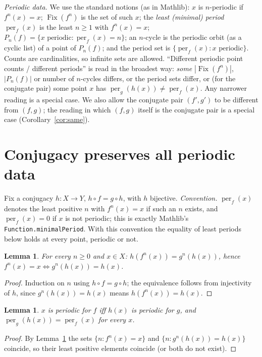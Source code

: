 \documentclass[11pt]{article}
\newtheorem{lemma}[theorem]{Lemma}
\theoremstyle{definition}
\theoremstyle{remark}
\renewcommand{\_}{\oldus\allowbreak}
\newcommand{\Fix}{\operatorname{Fix}}
\newcommand{\per}{\operatorname{per}}
\begin{document}
\emph{Periodic data.} We use the standard notions (as in Mathlib): $x$ is $n$-periodic if
$f^n(x)=x$; $\Fix(f^n)$ is the set of such $x$; the \emph{least (minimal) period} $\per_f(x)$ is the
least $n\ge1$ with $f^n(x)=x$; $P_n(f)=\{x \text{ periodic}: \per_f(x)=n\}$; an $n$-cycle is the periodic
orbit (as a cyclic list) of a point of $P_n(f)$; and the period set is $\{\per_f(x): x\text{ periodic}\}$.
Counts are cardinalities, so infinite sets are allowed. ``Different periodic point counts / different
periods'' is read in the broadest way: \emph{some} $|\Fix(f^n)|$, $|P_n(f)|$ or number of $n$-cycles
differs, or the period sets differ, or (for the conjugate pair) some point $x$ has
$\per_g(h(x))\neq\per_f(x)$. Any narrower reading is a special case. We also allow the conjugate pair
$(f',g')$ to be different from $(f,g)$; the reading in which $(f,g)$ itself is the conjugate pair is a
special case (Corollary~\ref{cor:same}).

\section{Conjugacy preserves all periodic data}

Fix a conjugacy $h\colon X\to Y$, $h\circ f=g\circ h$, with $h$ bijective.
\emph{Convention.} $\per_f(x)$ denotes the least positive $n$ with $f^n(x)=x$ if such an $n$ exists, and
$\per_f(x)=0$ if $x$ is not periodic; this is exactly Mathlib's \texttt{Function.minimalPeriod}. With
this convention the equality of least periods below holds at every point, periodic or not.

\begin{lemma}\label{lem:iter}
For every $n\ge0$ and $x\in X$: $h(f^n(x))=g^n(h(x))$, hence $f^n(x)=x \iff g^n(h(x))=h(x)$.
\end{lemma}
\begin{proof}
Induction on $n$ using $h\circ f=g\circ h$; the equivalence follows from injectivity of $h$, since
$g^n(h(x))=h(x)$ means $h(f^n(x))=h(x)$.
\end{proof}

\begin{lemma}\label{lem:per}
$x$ is periodic for $f$ iff $h(x)$ is periodic for $g$, and $\per_g(h(x))=\per_f(x)$ for every $x$.
\end{lemma}
\begin{proof}
By Lemma~\ref{lem:iter} the sets $\{n: f^n(x)=x\}$ and $\{n: g^n(h(x))=h(x)\}$ coincide, so their
least positive elements coincide (or both do not exist).
\end{proof}
\end{document}
